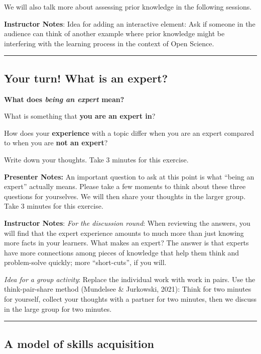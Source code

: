 \documentclass[
  letterpaper,
  DIV=11,
  numbers=noendperiod]{scrartcl}
\begin{document}
We will also talk more about assessing prior knowledge in the following
sessions.

\textbf{Instructor Notes}: Idea for adding an interactive element: Ask
if someone in the audience can think of another example where prior
knowledge might be interfering with the learning process in the context
of Open Science.

\begin{center}\rule{0.5\linewidth}{0.5pt}\end{center}

\subsection{Your turn! What is an
expert?}\label{your-turn-what-is-an-expert}

\textbf{What does \emph{being an expert} mean?}

What is something that \textbf{you are an expert in}?

How does your \textbf{experience} with a topic differ when you are an
expert compared to when you are \textbf{not an expert}?

Write down your thoughts. Take 3 minutes for this exercise.

\textbf{Presenter Notes:} An important question to ask at this point is
what ``being an expert'' actually means. Please take a few moments to
think about these three questions for yourselves. We will then share
your thoughts in the larger group. Take 3 minutes for this exercise.

\textbf{Instructor Notes}: \emph{For the discussion round}: When
reviewing the answers, you will find that the expert experience amounts
to much more than just knowing more facts in your learners. What makes
an expert? The answer is that experts have more connections among pieces
of knowledge that help them think and problem-solve quickly; more
``short-cuts'', if you will.

\emph{Idea for a group activity}: Replace the individual work with work
in pairs. Use the think-pair-share method (Mundelsee \& Jurkowski,
2021): Think for two minutes for yourself, collect your thoughts with a
partner for two minutes, then we discuss in the large group for two
minutes.

\begin{center}\rule{0.5\linewidth}{0.5pt}\end{center}

\subsection{A model of skills
acquisition}\label{a-model-of-skills-acquisition}
\end{document}

